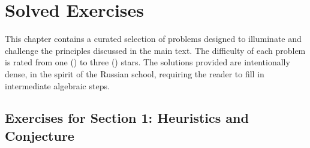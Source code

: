 
\chapter*{Solved Exercises}

This chapter contains a curated selection of problems designed to illuminate and challenge the principles discussed in the main text. The difficulty of each problem is rated from one () to three () stars. The solutions provided are intentionally dense, in the spirit of the Russian school, requiring the reader to fill in intermediate algebraic steps.

\section*{Exercises for Section 1: Heuristics and Conjecture}

